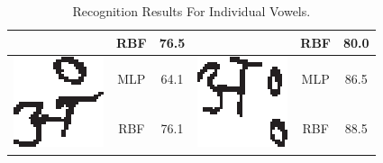 \begin{table}[h]
\begin{tabular}{|c|c|c|c|c|c|}
\cline{2-3} \cline{5-6}
 & RBF & 76.5 &  & RBF & 80.0\tabularnewline
\hline
\multirow{2}{*}{\includegraphics[scale=0.25]{figures/datasets/nhcr/vowels/11an}} & MLP & 64.1 & \multirow{2}{*}{\includegraphics[scale=0.25]{figures/datasets/nhcr/vowels/12ah}} & MLP & 86.5\tabularnewline
\cline{2-3} \cline{5-6}
 & RBF & 76.1 &  & RBF & 88.5\tabularnewline
\hline
\end{tabular}
\caption{Recognition Results For Individual Vowels.}
\label{table_recognition_result_for_individual_vowels}
\end{table}

